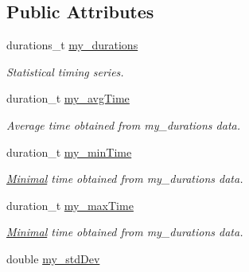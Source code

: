 \subsection*{Public Attributes}
\begin{DoxyCompactItemize}
\item 
\hypertarget{structPerf_1_1internal_1_1TimingSeries_aafd774a6acd03bc0bf3ed96e1016c812}{}durations\+\_\+t \hyperlink{structPerf_1_1internal_1_1TimingSeries_aafd774a6acd03bc0bf3ed96e1016c812}{my\+\_\+durations}\label{structPerf_1_1internal_1_1TimingSeries_aafd774a6acd03bc0bf3ed96e1016c812}

\begin{DoxyCompactList}\small\item\em Statistical timing series. \end{DoxyCompactList}\item 
\hypertarget{structPerf_1_1internal_1_1TimingSeries_a95c5ee2223007db083bf544267d7c1c6}{}duration\+\_\+t \hyperlink{structPerf_1_1internal_1_1TimingSeries_a95c5ee2223007db083bf544267d7c1c6}{my\+\_\+avg\+Time}\label{structPerf_1_1internal_1_1TimingSeries_a95c5ee2223007db083bf544267d7c1c6}

\begin{DoxyCompactList}\small\item\em Average time obtained from my\+\_\+durations data. \end{DoxyCompactList}\item 
\hypertarget{structPerf_1_1internal_1_1TimingSeries_ae65e8c66eb191df917eed56399ace5f2}{}duration\+\_\+t \hyperlink{structPerf_1_1internal_1_1TimingSeries_ae65e8c66eb191df917eed56399ace5f2}{my\+\_\+min\+Time}\label{structPerf_1_1internal_1_1TimingSeries_ae65e8c66eb191df917eed56399ace5f2}

\begin{DoxyCompactList}\small\item\em \hyperlink{classMinimal}{Minimal} time obtained from my\+\_\+durations data. \end{DoxyCompactList}\item 
\hypertarget{structPerf_1_1internal_1_1TimingSeries_a8483d1588b7ed76bcd71f924886feeb1}{}duration\+\_\+t \hyperlink{structPerf_1_1internal_1_1TimingSeries_a8483d1588b7ed76bcd71f924886feeb1}{my\+\_\+max\+Time}\label{structPerf_1_1internal_1_1TimingSeries_a8483d1588b7ed76bcd71f924886feeb1}

\begin{DoxyCompactList}\small\item\em \hyperlink{classMinimal}{Minimal} time obtained from my\+\_\+durations data. \end{DoxyCompactList}\item 
\hypertarget{structPerf_1_1internal_1_1TimingSeries_a6637fca8253e6ee2e7622ffe87884672}{}double \hyperlink{structPerf_1_1internal_1_1TimingSeries_a6637fca8253e6ee2e7622ffe87884672}{my\+\_\+std\+Dev}\label{structPerf_1_1internal_1_1TimingSeries_a6637fca8253e6ee2e7622ffe87884672}


\end{DoxyCompactItemize}

